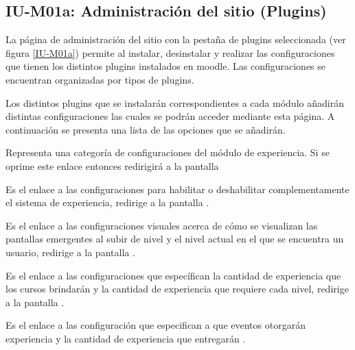 \subsection{IU-M01a: Administración del sitio (Plugins)}

 La página de administración del sitio con la pestaña de plugins seleccionada (ver figura
 \ref{IU-M01a}) permite al  instalar, desinstalar y realizar las
 configuraciones que tienen los distintos plugins instalados en moodle. Las configuraciones se
 encuentran organizadas por tipos de plugins.


 \noindent 
 Los distintos plugins que se instalarán correspondientes a cada módulo añadirán distintas
 configuraciones las cuales se podrán acceder mediante esta página. A continuación se presenta
 una lista de las opciones que se añadirán.

    \begin{description}[font=\color{primary}]

            Representa una categoría de configuraciones del módulo de experiencia. Si se oprime
            este enlace entonces redirigirá a la pantalla \hfill

        \begin{description}[font={\labelitemi\ \color{black}}]

            Es el enlace a las configuraciones para habilitar o deshabilitar complementamente
            el sistema de experiencia, redirige a la pantalla .

            Es el enlace a las configuraciones visuales acerca de cómo se visualizan las
            pantallas emergentes al subir de nivel y el nivel actual en el que se encuentra
            un usuario, redirige a la pantalla .

            Es el enlace a las configuraciones que específican la cantidad de experiencia que
            los cursos brindarán y la cantidad de experiencia que requiere cada nivel, redirige
            a la pantalla .

            Es el enlace a las configuración que especifican a que eventos otorgarán experiencia
            y la cantidad de experiencia que entregarán .
        \end{description}

    \end{description}

\clearpage
